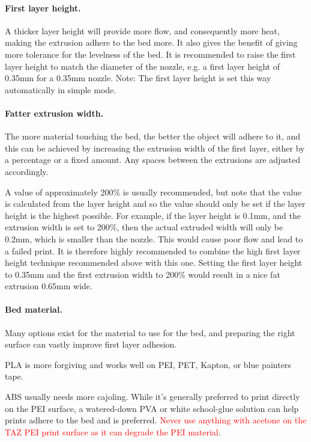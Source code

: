 \paragraph{First layer height.} %
\label{par:first_layer_height}
A thicker layer height will provide more flow, and consequently more heat, making the extrusion adhere to the bed more.  It also gives the benefit of giving more tolerance for the levelness of the bed.  It is recommended to raise the first layer height to match the diameter of the nozzle, e.g. a first layer height of 0.35mm for a 0.35mm nozzle.
Note: The first layer height is set this way automatically in simple mode.

\paragraph{Fatter extrusion width.} %
\label{par:wider_extrusion_width}
The more material touching the bed, the better the object will adhere to it, and this can be achieved by increasing the extrusion width of the first layer, either by a percentage or a fixed amount.  Any spaces between the extrusions are adjusted accordingly.

A value of approximately 200\% is usually recommended, but note that the value is calculated from the layer height and so the value should only be set if the layer height is the highest possible.  For example, if the layer height is 0.1mm, and the extrusion width is set to 200\%, then the actual extruded width will only be 0.2mm, which is smaller than the nozzle.   This would cause poor flow and lead to a failed print.  It is therefore highly recommended to combine the high first layer height technique recommended above with this one. Setting the first layer height to 0.35mm and the first extrusion width to 200\% would result in a nice fat extrusion 0.65mm wide.

\paragraph{Bed material.} %
\label{par:bed_material}
Many options exist for the material to use for the bed, and preparing the right surface can vastly improve first layer adhesion.

PLA is more forgiving and works well on PEI, PET, Kapton, or blue painters tape.

ABS usually needs more cajoling. While it's generally preferred to print directly on the PEI surface, a watered-down PVA or white school-glue solution can help prints adhere to the bed and is preferred. \textcolor{red}{Never use anything with acetone on the TAZ PEI print surface as it can degrade the PEI material}. 

